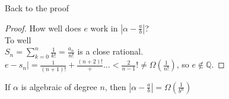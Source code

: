   Back to the proof
  \begin{proof}
    How well does $e$ work in $|\alpha - \frac{a}{b}|$?\\
    To well\\
    $S_n = \sum_{k = 0}^{n} \frac{1}{k!} = \frac{a_n}{n!}$ is a close
    rational.\\
    $e - s_n| = \frac{1}{(n+1)!} + \frac{(n+2)!} + \ldots < \frac{2}{n-1}! 
    \not= \Omega(\frac{1}{n!})$, so $e \not\in \mathbb{Q}$.
  \end{proof}
  \begin{theorem}
    If $\alpha$ is algebraic of degree $n$, then $|\alpha - \frac{a}{b}|
     = \Omega(\frac{1}{b^n})$
  \end{theorem}
